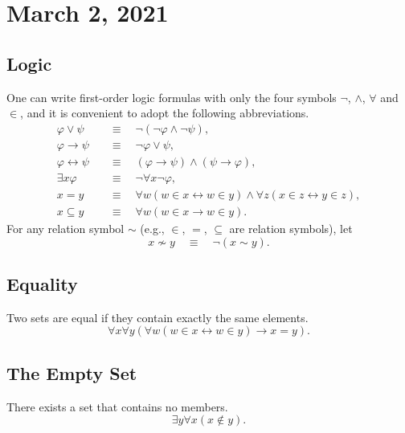 \documentclass[11pt]{article}
\begin{document}
\section{March 2, 2021}
\subsection{Logic}
One can write first-order logic formulas with only the four symbols $\neg$, $\wedge$, $\forall$ and $\in$, and it is convenient to adopt the following abbreviations.
\begin{align*}
  \varphi \vee \psi \quad &\equiv \quad \neg (\neg \varphi \wedge \neg \psi), \\
  \varphi \rightarrow \psi \quad &\equiv \quad \neg \varphi \vee \psi, \\
  \varphi \leftrightarrow \psi \quad &\equiv \quad (\varphi \rightarrow \psi) \wedge (\psi \rightarrow \varphi), \\
  \exists x \varphi \quad &\equiv \quad \neg \forall x \neg \varphi, \\
  x = y \quad &\equiv \quad \forall w (w \in x \leftrightarrow w \in y) \wedge \forall z (x \in z \leftrightarrow y \in z), \\
  x \subseteq y \quad &\equiv \quad \forall w (w \in x \rightarrow w \in y).
\end{align*}
For any relation symbol $\sim$ (e.g., $\in$, $=$, $\subseteq$ are relation symbols), let
\begin{equation*}
  x \not\sim y \quad \equiv \quad \neg (x \sim y).
\end{equation*}

\subsection{Equality}
\begin{axiom}[Extensionality]
  Two sets are equal if they contain exactly the same elements.
  \begin{equation*}
    \forall x \forall y (\forall w (w \in x \leftrightarrow w \in y) \rightarrow x = y). 
  \end{equation*}
\end{axiom}

\subsection{The Empty Set}
\begin{axiom}
  There exists a set that contains no members.
  \begin{equation*}
    \exists y \forall x (x \notin y).
  \end{equation*}
\end{axiom}
\end{document}
